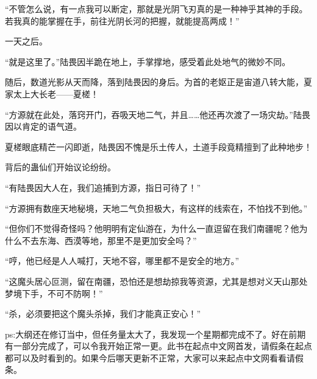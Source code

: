 \begin{this_body}
“不管怎么说，有一点我可以断定，那就是光阴飞刃真的是一种神乎其神的手段。若我真的能掌握在手，前往光阴长河的把握，就能提高两成！”

一天之后。

“就是这里了。”陆畏因半跪在地上，手掌撑地，感受着此处地气的微妙不同。

随后，数道光影从天而降，落到陆畏因的身后。为首的老妪正是宙道八转大能，夏家太上大长老——夏槎！

“方源就在此处，落窍开门，吞吸天地二气，并且……他还再次渡了一场灾劫。”陆畏因以肯定的语气道。

夏槎眼底精芒一闪即逝，陆畏因不愧是乐土传人，土道手段竟精擅到了此种地步！

背后的蛊仙们开始议论纷纷。

“有陆畏因大人在，我们追捕到方源，指日可待了！”

“方源拥有数座天地秘境，天地二气负担极大，有这样的线索在，不怕找不到他。”

“但你们不觉得奇怪吗？他明明有定仙游在，为什么一直逗留在我们南疆呢？他为什么不去东海、西漠等地，那里不是更加安全吗？”

“哼，他已经是人人喊打，天地不容，哪里都不是安全的地方。”

“这魔头居心叵测，留在南疆，恐怕还是想劫掠我等资源，尤其是想对义天山那处梦境下手，不可不防啊！”

“杀，必须要把这个魔头杀掉，我们才能真正安心！”

ps:大纲还在修订当中，但任务量太大了，我发现一个星期都完成不了。好在前期有一部分完成了，可以令我开始正常一更。此书在起点中文网首发，请假条在起点都可以及时看到的。如果今后哪天更新不正常，大家可以来起点中文网看看请假条。

\end{this_body}

